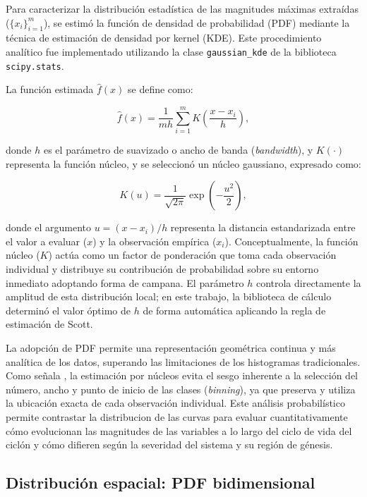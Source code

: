 Para caracterizar la distribución estadística de las magnitudes máximas extraídas ($\{x_i\}_{i=1}^{m}$), se estimó la función de densidad de probabilidad (PDF) mediante la técnica de estimación de densidad por kernel (KDE). 
Este procedimiento analítico fue implementado utilizando la clase \texttt{gaussian\_kde} de la biblioteca \texttt{scipy.stats}. 

La función estimada $\hat{f}(x)$ se define como:

\begin{equation}
    \hat{f}(x) = \frac{1}{m h} \sum_{i=1}^{m} K\left(\frac{x - x_i}{h}\right),
\label{eq:kde_pdf}
\end{equation}

donde $h$ es el parámetro de suavizado o ancho de banda (\textit{bandwidth}), y $K(\cdot)$ representa la función núcleo, y se seleccionó un núcleo gaussiano, expresado como:

\begin{equation}
    K(u) = \frac{1}{\sqrt{2\pi}} \exp\left(-\frac{u^2}{2}\right),
\label{eq:gaussian_kernel}
\end{equation}

donde el argumento $u = (x - x_i)/h$ representa la distancia estandarizada entre el valor a evaluar ($x$) y la observación empírica ($x_i$). 
Conceptualmente, la función núcleo ($K$) actúa como un factor de ponderación que toma cada observación individual y distribuye su contribución de probabilidad sobre su entorno inmediato adoptando forma de campana. 
El parámetro $h$ controla directamente la amplitud de esta distribución local; en este trabajo, la biblioteca de cálculo determinó el valor óptimo de $h$ de forma automática aplicando la regla de estimación de Scott. 

La adopción de PDF permite una representación geométrica continua y más analítica de los datos, superando las limitaciones de los histogramas tradicionales. 
Como señala \citet{weglarczyk2018kernel}, la estimación por núcleos evita el sesgo inherente a la selección del número, ancho y punto de inicio de las clases (\textit{binning}), ya que preserva y utiliza la ubicación exacta de cada observación individual. 
Este análisis probabilístico permite contrastar la distribucion de las curvas para evaluar cuantitativamente cómo evolucionan las magnitudes de las variables a lo largo del ciclo de vida del ciclón y cómo difieren según la severidad del sistema y su región de génesis.

\subsection{Distribución espacial: PDF bidimensional}\label{subsec:kde_localizacion}

